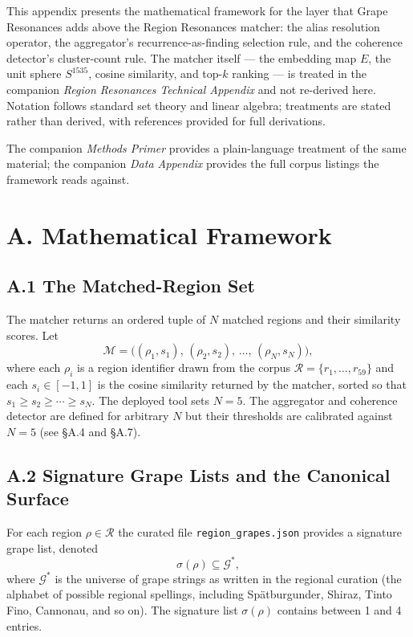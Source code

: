 \documentclass[11pt]{article}
\begin{document}

This appendix presents the mathematical framework for the layer that Grape Resonances adds above the Region Resonances matcher: the alias resolution operator, the aggregator's recurrence-as-finding selection rule, and the coherence detector's cluster-count rule. The matcher itself --- the embedding map $E$, the unit sphere $S^{1535}$, cosine similarity, and top-$k$ ranking --- is treated in the companion \emph{Region Resonances Technical Appendix} and not re-derived here. Notation follows standard set theory and linear algebra; treatments are stated rather than derived, with references provided for full derivations.

The companion \emph{Methods Primer} provides a plain-language treatment of the same material; the companion \emph{Data Appendix} provides the full corpus listings the framework reads against.

\section*{A. Mathematical Framework}

\subsection*{A.1 The Matched-Region Set}
The matcher returns an ordered tuple of $N$ matched regions and their similarity scores. Let
\[
\mathcal{M} = \bigl( (\rho_1, s_1), \, (\rho_2, s_2), \, \ldots, \, (\rho_N, s_N) \bigr),
\]
where each $\rho_i$ is a region identifier drawn from the corpus $\mathcal{R} = \{r_1, \ldots, r_{59}\}$ and each $s_i \in [-1, 1]$ is the cosine similarity returned by the matcher, sorted so that $s_1 \geq s_2 \geq \cdots \geq s_N$. The deployed tool sets $N = 5$. The aggregator and coherence detector are defined for arbitrary $N$ but their thresholds are calibrated against $N = 5$ (see \S A.4 and \S A.7).

\subsection*{A.2 Signature Grape Lists and the Canonical Surface}
For each region $\rho \in \mathcal{R}$ the curated file \texttt{region\_grapes.json} provides a signature grape list, denoted
\[
\sigma(\rho) \subseteq \mathcal{G}^{*},
\]
where $\mathcal{G}^{*}$ is the universe of grape strings as written in the regional curation (the alphabet of possible regional spellings, including Spätburgunder, Shiraz, Tinto Fino, Cannonau, and so on). The signature list $\sigma(\rho)$ contains between 1 and 4 entries.
\end{document}
